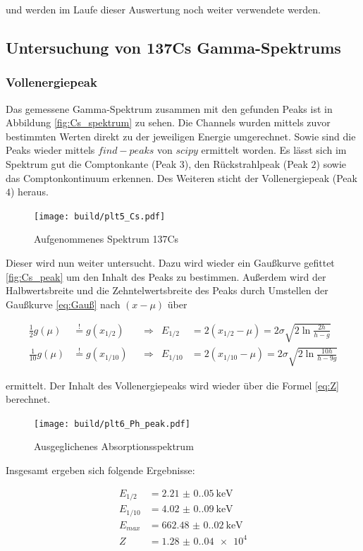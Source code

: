 und werden im Laufe dieser Auswertung noch weiter verwendete werden. 

\subsection{Untersuchung von 137Cs Gamma-Spektrums}
\subsubsection{Vollenergiepeak}
Das gemessene Gamma-Spektrum zusammen mit den gefunden Peaks ist in Abbildung \eqref{fig:Cs_spektrum} zu sehen. 
Die Channels wurden mittels zuvor bestimmten Werten direkt zu der jeweiligen Energie umgerechnet. 
Sowie sind die Peaks wieder mittels $find-peaks$ von $scipy$ \cite{scipy} ermittelt worden. 
Es lässt sich im Spektrum gut die Comptonkante (Peak $3$), den Rückstrahlpeak (Peak $2$) sowie das Comptonkontinuum erkennen. 
Des Weiteren sticht der Vollenergiepeak (Peak $4$) heraus.

\begin{figure}[H]
    \centering
    \texttt{[image: build/plt5\_Cs.pdf]}
	\caption{Aufgenommenes Spektrum 137Cs}
	\label{fig:Cs_spektrum}
\end{figure}

Dieser wird nun weiter untersucht.
Dazu wird wieder ein Gaußkurve gefittet \eqref{fig:Cs_peak} um den Inhalt des Peaks zu bestimmen.
Außerdem wird der Halbwertsbreite und die Zehntelwertsbreite des Peaks durch Umstellen der Gaußkurve \eqref{eq:Gauß} nach $(x-\mu)$ über

\begin{align*}
	\frac{1}{2}g(\mu)&\stackrel{!}{=}g(x_{1/2})& &\Rightarrow &E_{1/2}&=2(x_{1/2}-\mu)=2\sigma \sqrt{2 \ln{\frac{2h}{h-g}}}\\
	\frac{1}{10}g(\mu)&\stackrel{!}{=}g(x_{1/10})& &\Rightarrow &E_{1/10}&=2(x_{1/10}-\mu)=2\sigma \sqrt{2 \ln{\frac{10h}{h-9g}}}
\end{align*}

ermittelt.
Der Inhalt des Vollenergiepeaks wird wieder über die Formel \eqref{eq:Z} berechnet. 

\begin{figure}[H]
    \centering
    \texttt{[image: build/plt6\_Ph\_peak.pdf]}
	\caption{Ausgeglichenes Absorptionsspektrum}
	\label{fig:Cs_peak}
\end{figure}

Insgesamt ergeben sich folgende Ergebnisse:

\begin{align*}
	E_{1/2}&=\qty{2.21(0.05)}{\kilo\eV}\\
	E_{1/10}&=\qty{4.02(0.09)}{\kilo\eV}\\
	E_{max}&=\qty{662.48(0.02)}{\kilo\eV}\\
	Z&=\num{1.28(0.04)e4}\\
\end{align*}

